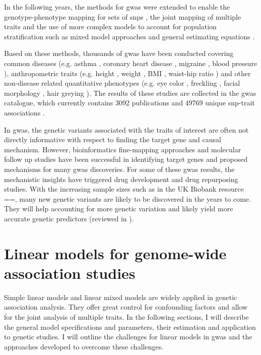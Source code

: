 In the following years, the methods for \gls{gwas} were extended to enable the genotype-phenotype mapping for sets of \glspl{snp}  \citep{Wu2010,Casale2015}, the joint mapping of multiple traits \citep{Korte2012,Yang2011,Bottolo2013,Casale2015} and the use of more complex models to account for population stratification such as mixed model approaches \citep{Kang2010,Lippert2011,Zhang2010,Svishcheva2012} and general estimating equations \citep{Cupples2007}.

Based on these methods, thousands of \gls{gwas} have been conducted covering common diseases (e.g. asthma \citep{Noguchi2011,Pickrell2016}, coronary heart disease \citep{Wild2011,Takeuchi2012,Lu2012}, migraine \citep{Pickrell2016,Gormley2016}, blood pressure \citep{Kato2011,Franceschini2013}), anthropometric traits (e.g. height \citep{Lango2010,Wood2014}, weight \citep{Willer2009}, BMI \citep{Speliotes2010,Yang2012a}, waist-hip ratio \citep{Lindgren2009,Heid2010}) and other non-disease related quantitative phenotypes (e.g. eye color \citep{Eriksson2010,Candille2012,Zhang2013}, freckling \citep{Sulem2008}, facial morphology \citep{Paternoster2012}, hair greying \citep{Adhikari2016}). The results of these studies are collected in the \gls{gwas} catalogue, which currently contains \num{3092} publications and \num{49769} unique \gls{snp}-trait associations \citep[accessed 10.09.2017]{MacArthur2017}. 

In \gls{gwas}, the genetic variants associated with the traits of interest are often not directly informative with respect to finding the target gene and causal mechanism. However, bioinformatics fine-mapping approaches and molecular follow up studies have been successful in identifying target genes and proposed mechanisms for many \gls{gwas} discoveries. For some of these \gls{gwas} results, the mechanistic insights have triggered drug development and drug repurposing studies. With the increasing sample sizes such as in the UK Biobank resource ==\citep{Sudlow2015}, many new genetic variants are likely to be discovered in the years to come. They will help accounting for more genetic variation and likely yield more accurate genetic predictors (reviewed in \citep{Visscher2017}).
 

\section{Linear models for genome-wide association studies}
\label{section:LinearModels}
Simple linear models and linear mixed models are widely applied in genetic association analysis. They offer great control for confounding factors and allow for the joint analysis of multiple traits. In the following sections, I will describe the general model specifications and parameters, their estimation and application to genetic studies. I will outline the challenges for linear models in \gls{gwas} and the approaches developed to overcome these challenges. 

